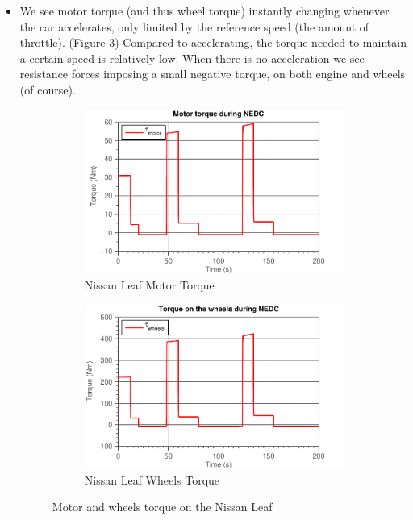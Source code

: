 \documentclass[11pt,titlepage]{report}
\begin{document}
\begin{enumerate}
\begin{itemize}
		\item
		We see motor torque (and thus wheel torque) instantly changing whenever the car accelerates, only limited by the reference speed (the amount of throttle). (Figure \ref{fig:ass4-t1-torque}) Compared to accelerating, the torque needed to maintain a certain speed is relatively low. When there is no acceleration we see resistance forces imposing a small negative torque, on both engine and wheels (of course).

		\begin{figure}[H]
			\begin{center}
				\begin{subfigure}[h]{0.49\textwidth}
					\includegraphics[width=\textwidth]{resource/leaf/torque-motor-rc.pdf}
					\caption{Nissan Leaf Motor Torque}
					\label{fig:ass4-t1-torque-motor}
				\end{subfigure}
				\enspace
				\begin{subfigure}[h]{0.49\textwidth}
					\includegraphics[width=\textwidth]{resource/leaf/torque-wheels-rc.pdf}
					\caption{Nissan Leaf Wheels Torque}
					\label{fig:ass4-t1-torque-wheels}
				\end{subfigure}
			\end{center}
			\caption{Motor and wheels torque on the Nissan Leaf}
			\label{fig:ass4-t1-torque}
		\end{figure}


\end{itemize}
\end{enumerate}
\end{document}
